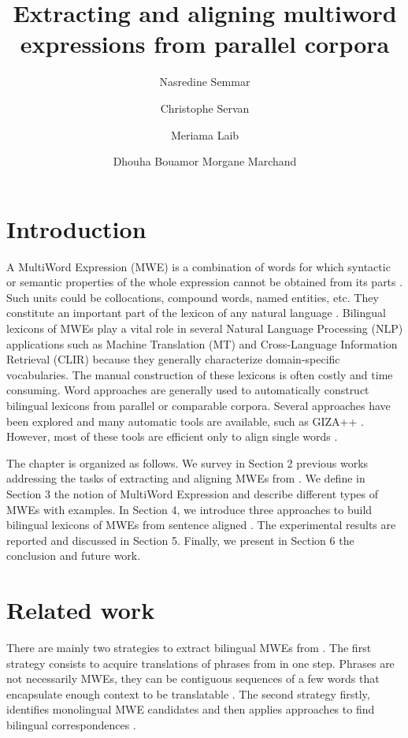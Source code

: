 \documentclass[output=paper,modfonts,nonflat]{langsci/langscibook}
\title{Extracting and aligning multiword expressions from parallel corpora}
\author{%
 Nasredine Semmar\affiliation{CEA LIST, Vision and Content Engineering Laboratory}\and 
 Christophe Servan\affiliation{University of Grenoble Alpes -- Grenoble Informatics Laboratory\\ SYSTRAN}\and
 Meriama Laib\affiliation{CEA LIST, Vision and Content Engineering Laboratory}\and
 Dhouha Bouamor\affiliation{Actimos, Groupe Accord}\lastand 
 Morgane Marchand\affiliation{eXenSa}
}
\begin{document}
\maketitle

\section{Introduction}

A MultiWord Expression (MWE) is a combination of words for which syntactic or semantic properties of the whole expression cannot be obtained from its parts \citep{sag02}. Such units could be collocations, compound words, named entities, etc. They constitute an important part of the lexicon of any natural language \citep{jackendoff1997architecture}. Bilingual lexicons of MWEs play a vital role in several Natural Language Processing (NLP) applications such as Machine Translation (MT) and Cross-Language Information Retrieval (CLIR) because they generally characterize domain-specific vocabularies. The manual construction of these lexicons is often costly and time consuming. Word  approaches are generally used to automatically construct bilingual lexicons from parallel or comparable corpora. Several  approaches have been explored \citep{daille1994towards,blank2000terminology,barbu2004} and many automatic  tools are available, such as GIZA++ \citep{och2000improved}. However, most of these tools are efficient only to align single words \citep{fraser2007measuring}.

The chapter is organized as follows. We survey in Section 2 previous works addressing the tasks of extracting and aligning MWEs from . We define in Section 3 the notion of MultiWord Expression and describe different types of MWEs with examples.  In Section 4, we introduce three approaches to build bilingual lexicons of MWEs from sentence aligned . The experimental results are reported and discussed in Section 5. Finally, we present in Section 6 the conclusion and future work.

\section{Related work}

There are mainly two strategies to extract bilingual MWEs from . The first strategy consists to acquire translations of phrases from  in one step. Phrases are not necessarily MWEs, they can be contiguous sequences of a few words that encapsulate enough context to be translatable \citep{denero2008complexity}. The second strategy firstly, identifies monolingual MWE candidates and then applies  approaches to find bilingual correspondences \citep{daille1994towards,blank2000terminology,gaussier2011modeles,barbu2004}. 
\end{document}
